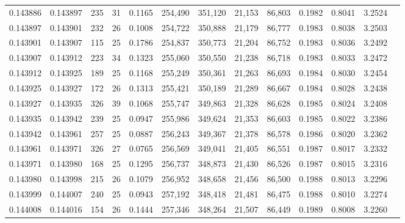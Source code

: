 \begin{tabular}{rrrrrrrrrrrrr}
0.143886 & 0.143897 & 235 &  31 &                                     0.1165 & 254,490 & 351,120 &  21,153 &  86,803 & 0.1982 & 0.8041 & 3.2524 \\
0.143897 & 0.143901 & 232 &  26 &                                     0.1008 & 254,722 & 350,888 &  21,179 &  86,777 & 0.1983 & 0.8038 & 3.2503 \\
0.143901 & 0.143907 & 115 &  25 &                                     0.1786 & 254,837 & 350,773 &  21,204 &  86,752 & 0.1983 & 0.8036 & 3.2492 \\
0.143907 & 0.143912 & 223 &  34 &                                     0.1323 & 255,060 & 350,550 &  21,238 &  86,718 & 0.1983 & 0.8033 & 3.2472 \\
0.143912 & 0.143925 & 189 &  25 &                                     0.1168 & 255,249 & 350,361 &  21,263 &  86,693 & 0.1984 & 0.8030 & 3.2454 \\
0.143925 & 0.143927 & 172 &  26 &                                     0.1313 & 255,421 & 350,189 &  21,289 &  86,667 & 0.1984 & 0.8028 & 3.2438 \\
0.143927 & 0.143935 & 326 &  39 &                                     0.1068 & 255,747 & 349,863 &  21,328 &  86,628 & 0.1985 & 0.8024 & 3.2408 \\
0.143935 & 0.143942 & 239 &  25 &                                     0.0947 & 255,986 & 349,624 &  21,353 &  86,603 & 0.1985 & 0.8022 & 3.2386 \\
0.143942 & 0.143961 & 257 &  25 &                                     0.0887 & 256,243 & 349,367 &  21,378 &  86,578 & 0.1986 & 0.8020 & 3.2362 \\
0.143961 & 0.143971 & 326 &  27 &                                     0.0765 & 256,569 & 349,041 &  21,405 &  86,551 & 0.1987 & 0.8017 & 3.2332 \\
0.143971 & 0.143980 & 168 &  25 &                                     0.1295 & 256,737 & 348,873 &  21,430 &  86,526 & 0.1987 & 0.8015 & 3.2316 \\
0.143980 & 0.143998 & 215 &  26 &                                     0.1079 & 256,952 & 348,658 &  21,456 &  86,500 & 0.1988 & 0.8013 & 3.2296 \\
0.143999 & 0.144007 & 240 &  25 &                                     0.0943 & 257,192 & 348,418 &  21,481 &  86,475 & 0.1988 & 0.8010 & 3.2274 \\
0.144008 & 0.144016 & 154 &  26 &                                     0.1444 & 257,346 & 348,264 &  21,507 &  86,449 & 0.1989 & 0.8008 & 3.2260 \\

\end{tabular}
